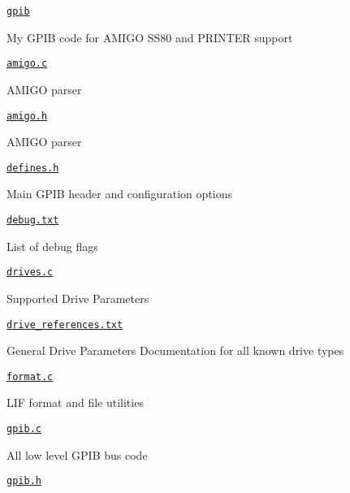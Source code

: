 \begin{DoxyItemize}
\item \href{gpib/gpib}{\tt gpib}
\begin{DoxyItemize}
\item My G\+P\+IB code for A\+M\+I\+GO S\+S80 and P\+R\+I\+N\+T\+ER support
\item \href{gpib/amigo.c}{\tt amigo.\+c}
\begin{DoxyItemize}
\item A\+M\+I\+GO parser
\end{DoxyItemize}
\item \href{gpib/amigo.h}{\tt amigo.\+h}
\begin{DoxyItemize}
\item A\+M\+I\+GO parser
\end{DoxyItemize}
\item \href{gpib/defines.h}{\tt defines.\+h}
\begin{DoxyItemize}
\item Main G\+P\+IB header and configuration options
\end{DoxyItemize}
\item \href{debug.txt}{\tt debug.\+txt}
\begin{DoxyItemize}
\item List of debug flags
\end{DoxyItemize}
\item \href{gpib/drives.c}{\tt drives.\+c}
\begin{DoxyItemize}
\item Supported Drive Parameters
\end{DoxyItemize}
\item \href{gpib/drive_references.txt}{\tt drive\+\_\+references.\+txt}
\begin{DoxyItemize}
\item General Drive Parameters Documentation for all known drive types
\end{DoxyItemize}
\item \href{gpib/format.c}{\tt format.\+c}
\begin{DoxyItemize}
\item L\+IF format and file utilities
\end{DoxyItemize}
\item \href{gpib/gpib.c}{\tt gpib.\+c}
\begin{DoxyItemize}
\item All low level G\+P\+IB bus code
\end{DoxyItemize}
\item \href{gpib/gpib.h}{\tt gpib.\+h}

\end{DoxyItemize}
\end{DoxyItemize}
